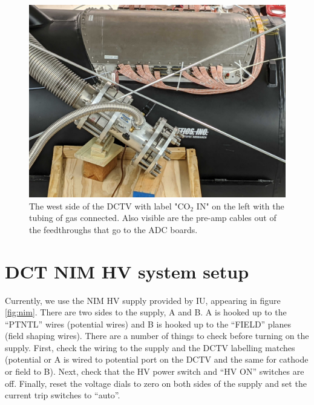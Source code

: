 \documentclass[12pt]{article}
\begin{document}
\begin{figure}
  \centering
  \includegraphics[scale=0.08]{DCT_gas_input.jpg}
  \caption{The west side of the DCTV with label "CO$_{2}$ IN" on the left with the tubing of gas connected. Also visible are the pre-amp cables out of the feedthroughs that go to the ADC boards.}
  \label{fig:DCTV_gas_input}
\end{figure} %

\section{DCT NIM HV system setup}

Currently, we use the NIM HV supply provided by IU, appearing in figure \ref{fig:nim}. There are two sides to the supply, A and B. A is hooked up to the ``PTNTL'' wires (potential wires) and B is hooked up to the ``FIELD'' planes (field shaping wires). There are a number of things to check before turning on the supply. First, check the wiring to the supply and the DCTV labelling matches (potential or A is wired to potential port on the DCTV and the same for cathode or field to B). Next, check that the HV power switch and ``HV ON'' switches are off. Finally, reset the voltage dials to zero on both sides of the supply and set the current trip switches to ``auto''. 
\end{document}
